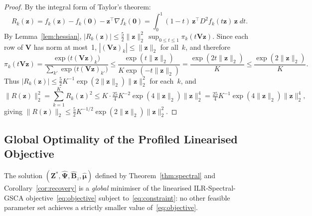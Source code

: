 \begin{proof}
By the integral form of Taylor's theorem:
\[
  R_k(\mathbf{z})
  = f_k(\mathbf{z}) - f_k(\mathbf{0})
    - \mathbf{z}^{\!\top}\nabla f_k(\mathbf{0})
  = \int_0^1 (1-t)\,
    \mathbf{z}^{\!\top}D^2\!f_k(t\mathbf{z})\,\mathbf{z}\;dt.
\]
By Lemma~\ref{lem:hessian},
$|R_k(\mathbf{z})| \leq \tfrac{5}{2}\|\mathbf{z}\|_2^2\,
 \sup_{0\leq t\leq 1}\pi_k(t\mathbf{V}\mathbf{z})$.
Since each row of $\mathbf{V}$ has norm at most~1,
$|(\mathbf{V}\mathbf{z})_k|\leq\|\mathbf{z}\|_2$ for all~$k$, and
therefore
\[
  \pi_k(t\mathbf{V}\mathbf{z})
  = \frac{\exp\bigl(t(\mathbf{V}\mathbf{z})_k\bigr)}
         {\sum_{k'}\exp\bigl(t(\mathbf{V}\mathbf{z})_{k'}\bigr)}
  \leq \frac{\exp(t\|\mathbf{z}\|_2)}
            {K\exp(-t\|\mathbf{z}\|_2)}
  = \frac{\exp(2t\|\mathbf{z}\|_2)}{K}
  \leq \frac{\exp(2\|\mathbf{z}\|_2)}{K}.
\]
Thus $|R_k(\mathbf{z})|
 \leq \tfrac{5}{2}K^{-1}\exp(2\|\mathbf{z}\|_2)\|\mathbf{z}\|_2^2$
for each~$k$, and
\[
  \|R(\mathbf{z})\|_2^2
  = \sum_{k=1}^K R_k(\mathbf{z})^2
  \leq K \cdot \tfrac{25}{4}K^{-2}
       \exp(4\|\mathbf{z}\|_2)\|\mathbf{z}\|_2^4
  = \tfrac{25}{4}K^{-1}
    \exp(4\|\mathbf{z}\|_2)\|\mathbf{z}\|_2^4,
\]
giving $\|R(\mathbf{z})\|_2
 \leq \tfrac{5}{2}K^{-1/2}
      \exp(2\|\mathbf{z}\|_2)\|\mathbf{z}\|_2^2$.
\end{proof}


\subsection{Global Optimality of the Profiled Linearised Objective}
\label{subsec:global_optimality}

\begin{theorem}
\label{thm:global}
The solution
$(\mathbf{Z}^*,\hat{\boldsymbol{\Psi}},
  \hat{\mathbf{B}}_z,\hat{\boldsymbol{\mu}})$
defined by Theorem~\ref{thm:spectral} and
Corollary~\ref{cor:recovery} is a \emph{global} minimiser
of the linearised ILR-Spectral-GSCA
objective~\eqref{eq:objective} subject
to~\eqref{eq:constraint}: no other feasible parameter set achieves a
strictly smaller value of~\eqref{eq:objective}.
\end{theorem}

